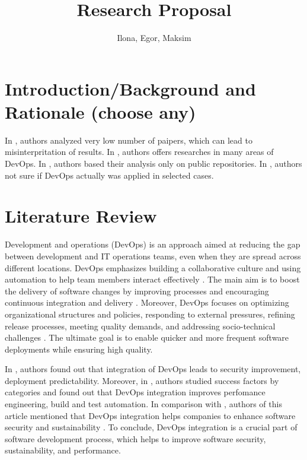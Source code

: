 \documentclass[oneside,final,12pt,a4paper]{extreport}
\title{Research Proposal}
\author{Ilona, Egor, Maksim}
\affil{Innopolis University}
\begin{document}
\maketitle

\newpage

\section{Introduction/Background and Rationale (choose any)}

In \cite{8}, authors analyzed very low number of paipers, which can lead to misinterpritation of results. In \cite{11}, authors offers researches in many areas of DevOps. In \cite{20}, authors based their analysis only on public repositories. In \cite{21}, authors not sure if DevOps actually was applied in selected cases.

\section{Literature Review}

Development and operations (DevOps) is an approach aimed at reducing the gap between development and IT operations teams, even when they are spread across different locations. DevOps emphasizes building a collaborative culture and using automation to help team members interact effectively \cite{7}. The main aim is to boost the delivery of software changes by improving processes and encouraging continuous integration and delivery \cite{11}. Moreover, DevOps focuses on optimizing organizational structures and policies, responding to external pressures, refining release processes, meeting quality demands, and addressing socio-technical challenges \cite{7}. The ultimate goal is to enable quicker and more frequent software deployments while ensuring high quality.

In \cite{7}, authors found out that integration of DevOps leads to security improvement, deployment predictability. Moreover, in \cite{9}, authors studied success factors by categories and found out that DevOps integration improves perfomance engineering, build and test automation. In comparison with \cite{9}, authors of this article mentioned that DevOps integration helps companies to enhance software security and sustainability \cite{12}\cite{18}. To conclude, DevOps integration is a crucial part of software development process, which helps to improve software security, sustainability, and performance.
\end{document}
